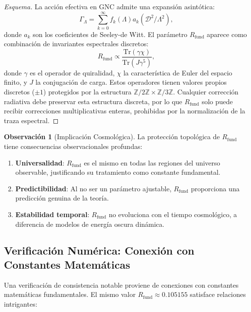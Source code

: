 \documentclass[12pt, a4paper]{article}
\theoremstyle{plain}
\theoremstyle{definition}
\newtheorem{observacion}{Observación}
\begin{document}
\begin{proof}[Esquema]
La acción efectiva en GNC admite una expansión asintótica:
\begin{equation}
\Gamma_\Lambda = \sum_{k=0}^\infty f_k(\Lambda) a_k(\mathcal{D}^2/\Lambda^2),
\end{equation}
donde $a_k$ son los coeficientes de Seeley-de Witt. El parámetro $R_{\text{fund}}$ aparece como combinación de invariantes espectrales discretos:
\begin{equation}
R_{\text{fund}} \propto \frac{\mathrm{Tr}(\gamma \chi)}{\mathrm{Tr}(J \gamma^5)},
\end{equation}
donde $\gamma$ es el operador de quiralidad, $\chi$ la característica de Euler del espacio finito, y $J$ la conjugación de carga. Estos operadores tienen valores propios discretos ($\pm 1$) protegidos por la estructura $\mathbb{Z}/2\mathbb{Z} \times \mathbb{Z}/3\mathbb{Z}$. Cualquier corrección radiativa debe preservar esta estructura discreta, por lo que $R_{\text{fund}}$ solo puede recibir correcciones multiplicativas enteras, prohibidas por la normalización de la traza espectral.
\end{proof}

\begin{observacion}[Implicación Cosmológica]
La protección topológica de $R_{\text{fund}}$ tiene consecuencias observacionales profundas:
\begin{enumerate}
    \item \textbf{Universalidad}: $R_{\text{fund}}$ es el mismo en todas las regiones del universo observable, justificando su tratamiento como constante fundamental.
    
    \item \textbf{Predictibilidad}: Al no ser un parámetro ajustable, $R_{\text{fund}}$ proporciona una predicción genuina de la teoría.
    
    \item \textbf{Estabilidad temporal}: $R_{\text{fund}}$ no evoluciona con el tiempo cosmológico, a diferencia de modelos de energía oscura dinámica.
\end{enumerate}
\end{observacion}

\subsection{Verificación Numérica: Conexión con Constantes Matemáticas}

Una verificación de consistencia notable proviene de conexiones con constantes matemáticas fundamentales. El mismo valor $R_{\text{fund}} \approx 0.105155$ satisface relaciones intrigantes:
\end{document}
